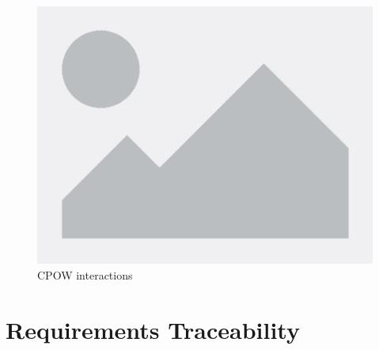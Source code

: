 \documentclass[table, 12pt]{article}
\begin{document}
\begin{center}
    \begin{figure}[H]
        \includegraphics[scale=0.6, center]{assets/placeholder.png}
        \caption{CPOW interactions}
        \label{fig: farmerInter}
    \end{figure}
\end{center}

\newpage

\section{Requirements Traceability}
\end{document}
